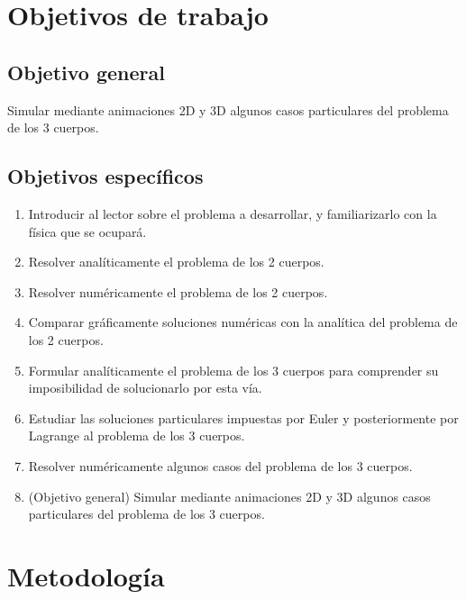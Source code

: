 \documentclass[proyecto.tex]{subfiles}
\begin{document}
\section{Objetivos de trabajo}

\subsection{Objetivo general}

\par Simular mediante animaciones 2D y 3D algunos casos particulares del problema de los 3 cuerpos.

\subsection{Objetivos específicos}
\begin{enumerate}
\item Introducir al lector sobre el problema a desarrollar, y familiarizarlo con la física que se ocupará.
\item Resolver analíticamente el problema de los 2 cuerpos. 
\item Resolver numéricamente el problema de los 2 cuerpos.
\item Comparar gráficamente soluciones numéricas con la analítica del problema de los 2 cuerpos.
\item Formular analíticamente el problema de los 3 cuerpos para comprender su imposibilidad de solucionarlo por esta vía.
\item Estudiar las soluciones particulares impuestas por Euler y posteriormente por Lagrange al problema de los 3 cuerpos.
\item Resolver numéricamente algunos casos del problema de los 3 cuerpos.
\item (Objetivo general) Simular mediante animaciones 2D y 3D algunos casos particulares del problema de los 3 cuerpos.
\end{enumerate}

\section{Metodología} \label{item:c}
\end{document}
